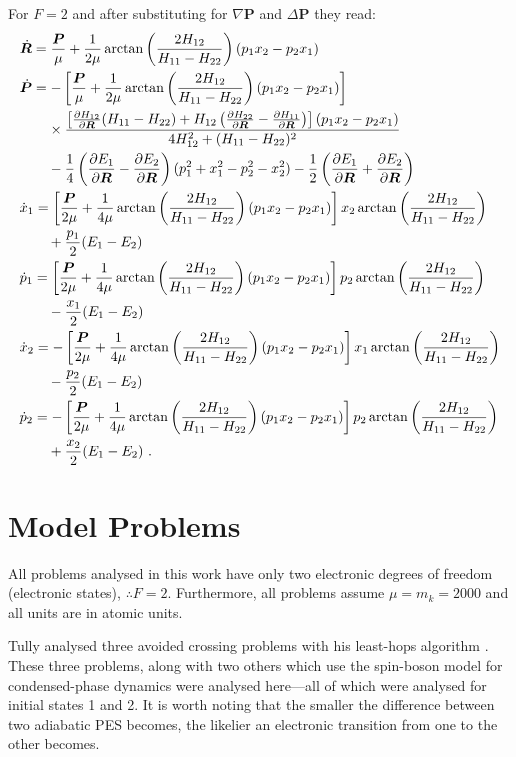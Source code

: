 For $ F=2 $ and after substituting for $ \nabla \bm{P} $ and $ \Delta \bm{P} $ 
they read:
\begin{subequations}\label{eq:adiab_motion_f=2}
\begin{align}
&\dot{\bm{R}} = \frac{\bm{P}}{\mu}+\frac{1}{2\mu} 
\arctan\left(\frac{2H_{12}}{H_{11}-H_{22}}\right)(p_{1}x_{2}-p_{2}x_{1})\\
&\dot{\bm{P}} = -\left[\frac{\bm{P}}{\mu}+\frac{1}{2\mu}  
\arctan\left(\frac{2H_{12}}{H_{11}-H_{22}}\right)(p_{1}x_{2}-p_{2}x_{1})\right]\nonumber\\
&\qquad\times\frac{\left[\frac{\partial H_{12}}{\partial \bm{R}}(H_{11}-H_{22})+H_{12}\left(\frac{\partial H_{22}}{\partial \bm{R}}-\frac{\partial H_{11}}{\partial \bm{R}}\right)\right](p_{1}x_{2}-p_{2}x_{1})}
{4H_{12}^{2}+(H_{11}-H_{22})^{2}}
\\
&\qquad-\frac{1}{4}\left(\frac{\partial E_{1}}{\partial \bm{R}}-\frac{\partial E_{2}}{\partial \bm{R}}\right)(p_{1}^{2}+x_{1}^{2}-p_{2}^{2}-x_{2}^{2})
-\frac{1}{2}\left(\frac{\partial E_{1}}{\partial \bm{R}}+\frac{\partial E_{2}}{\partial \bm{R}}\right)
\nonumber\\
&\dot{x}_{1} = \left[\frac{\bm{P}}{2\mu}+\frac{1}{4\mu} 
\arctan\left(\frac{2H_{12}}{H_{11}-H_{22}}\right)(p_{1}x_{2}-p_{2}x_{1})\right]x_{2}\arctan\left(\frac{2H_{12}}{H_{11}-H_{22}}\right)\nonumber\\
&\qquad+\frac{p_{1}}{2}(E_{1}-E_{2})\\
&\dot{p}_{1} = \left[\frac{\bm{P}}{2\mu}+\frac{1}{4\mu} 
\arctan\left(\frac{2H_{12}}{H_{11}-H_{22}}\right)(p_{1}x_{2}-p_{2}x_{1})\right]p_{2}\arctan\left(\frac{2H_{12}}{H_{11}-H_{22}}\right)\nonumber\\
&\qquad-\frac{x_{1}}{2}(E_{1}-E_{2})\\
&\dot{x}_{2} = -\left[\frac{\bm{P}}{2\mu}+\frac{1}{4\mu} 
\arctan\left(\frac{2H_{12}}{H_{11}-H_{22}}\right)(p_{1}x_{2}-p_{2}x_{1})\right]x_{1}\arctan\left(\frac{2H_{12}}{H_{11}-H_{22}}\right)\nonumber\\
&\qquad-\frac{p_{2}}{2}(E_{1}-E_{2})\\
&\dot{p}_{2} = -\left[\frac{\bm{P}}{2\mu}+\frac{1}{4\mu} 
\arctan\left(\frac{2H_{12}}{H_{11}-H_{22}}\right)(p_{1}x_{2}-p_{2}x_{1})\right]p_{2}\arctan\left(\frac{2H_{12}}{H_{11}-H_{22}}\right)\nonumber\\
&\qquad+\frac{x_{2}}{2}(E_{1}-E_{2})~.
\end{align}
\end{subequations}
%
\section{Model Problems}
%
All problems analysed in this work have only two electronic degrees of freedom (electronic states), $ \therefore  F = 2 $. Furthermore, all problems assume $ \mu = m_{k} = 2000 $ and all units are in atomic units.

Tully analysed three avoided crossing problems with his least-hops algorithm \cite{tully}. These three problems, along with two others which use the spin-boson model for condensed-phase dynamics were analysed here---all of which were analysed for initial states 1 and 2. It is worth noting that the smaller the difference between two adiabatic PES becomes, the likelier an electronic transition from one to the other becomes.
%
